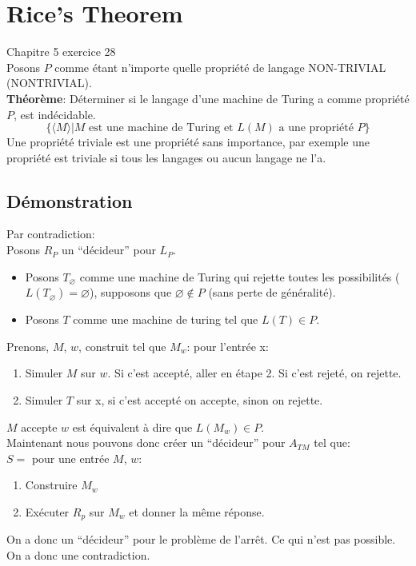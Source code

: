 \documentclass[a4paper,12pt]{article}
\begin{document}
\section{Rice's Theorem}
  Chapitre 5 exercice 28\\
  Posons $P$ comme étant n'importe quelle propriété de langage NON-TRIVIAL (NONTRIVIAL).\\
  \textbf{Théorème}: Déterminer si le langage d'une machine de Turing a comme propriété $P$, est indécidable.\\
  $$\{\langle M\rangle | M \text{ est une machine de Turing et } L(M) \text{ a une propriété } P\}$$
  Une propriété triviale est une propriété sans importance, par exemple une propriété est triviale si tous les langages ou aucun langage ne l'a.\\

  \subsection{Démonstration}
    Par contradiction:\\
    Posons $R_P$ un ``décideur'' pour $L_P$.
    \begin{itemize}
      \item Posons $T_{\varnothing}$ comme une machine de Turing qui rejette toutes les possibilités ($L(T_{\varnothing}) = \varnothing$),
			supposons que $\varnothing \notin P$ (sans perte de généralité).
      \item Posons $T$ comme une machine de turing tel que $L(T) \in P$.\\
    \end{itemize}
    Prenons, $M$, $w$, construit tel que $M_w$: pour l'entrée x:
    \begin{enumerate}
      \item Simuler $M$ sur $w$.  Si c'est accepté, aller en étape 2.  Si c'est rejeté, on rejette.
      \item Simuler $T$ sur x, si c'est accepté on accepte, sinon on rejette.
    \end{enumerate}
    $M$ accepte $w$ est équivalent à dire que $L(M_w) \in P$.\\
    Maintenant nous pouvons donc créer un ``décideur'' pour $A_{TM}$ tel que:\\
    $S = $ pour une entrée $M$, $w$:
    \begin{enumerate}
      \item Construire $M_w$
      \item Exécuter $R_p$ sur $M_w$ et donner la même réponse.
    \end{enumerate}
    On a donc un ``décideur'' pour le problème de l'arrêt.  Ce qui n'est pas possible.  On a donc une contradiction.
\end{document}
